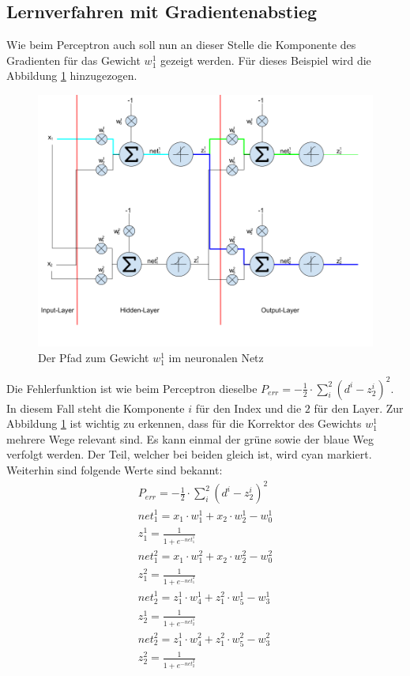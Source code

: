 \subsection{Lernverfahren mit Gradientenabstieg}
Wie beim Perceptron auch soll nun an dieser Stelle die Komponente des Gradienten für das Gewicht $w_1^1$ gezeigt
werden. Für dieses Beispiel wird die Abbildung \ref{fig:08_neuronal_network} hinzugezogen.
\begin{figure}[h!]
    \begin{center}
        \includegraphics[width=1\linewidth]{../common/01_neuronal_network/00_resources/03_neuronales_netz_pfad.png}
    \end{center}
    \caption{Der Pfad zum Gewicht $w_1^1$ im neuronalen Netz}
    \label{fig:08_neuronal_network}
\end{figure}
Die Fehlerfunktion ist wie beim Perceptron dieselbe $P_{err} = - \frac{1}{2} \cdot \sum_i^2 (d^i - z_2^i)^2$.
In diesem Fall steht die Komponente $i$ für den Index und die $2$ für den Layer.
Zur Abbildung \ref{fig:08_neuronal_network} ist wichtig zu erkennen, dass für die Korrektor des Gewichts $w_1^1$
mehrere Wege relevant sind. Es kann einmal der grüne sowie der blaue Weg verfolgt werden. Der Teil, welcher bei
beiden gleich ist, wird cyan markiert.
Weiterhin sind folgende Werte sind bekannt:
\begin{align}
    P_{err} = - \frac{1}{2} \cdot \sum_i^2 (d^i - z_2^i)^2\\
    net_1^1 = x_1 \cdot w_1^1 + x_2 \cdot w_2^1 - w_0^1\\
    z_1^1 = \frac{1}{1 + e^{-net_1^1}}\\
    net_1^2 = x_1 \cdot w_1^2 + x_2 \cdot w_2^2 - w_0^2\\
    z_1^2 = \frac{1}{1 + e^{-net_1^2}}\\
    net_2^1 = z_1^1 \cdot w_4^1 + z_1^2 \cdot w_5^1 - w_3^1\\
    z_2^1 = \frac{1}{1 + e^{-net_2^1}}\\
    net_2^2 = z_1^1 \cdot w_4^2 + z_1^2 \cdot w_5^2 - w_3^2\\
    z_2^2 = \frac{1}{1 + e^{-net_2^2}}
\end{align}
